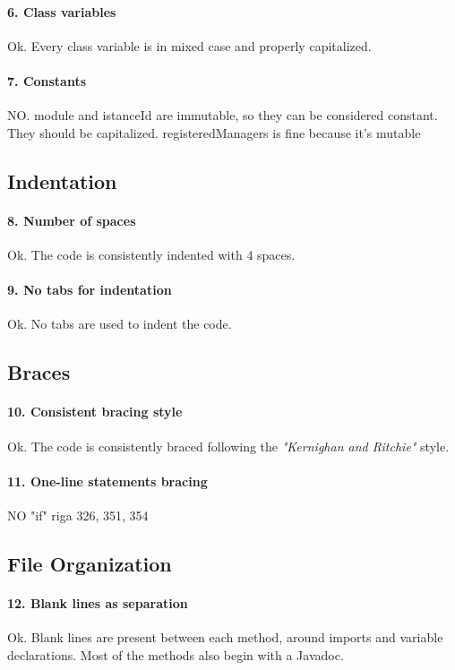 \documentclass[english]{article}
\begin{document}
\paragraph{6. Class variables}
Ok.
Every class variable is in mixed case and properly capitalized.

\paragraph{7. Constants}
NO.
module and istanceId are immutable, so they can be considered constant. They should be capitalized.
registeredManagers is fine because it's mutable

\subsection{Indentation}
\paragraph{8. Number of spaces}
Ok.
The code is consistently indented with 4 spaces.

\paragraph{9. No tabs for indentation}
Ok.
No tabs are used to indent the code.

\subsection{Braces}
\paragraph{10. Consistent bracing style}
Ok.
The code is consistently braced following the \textit{"Kernighan and Ritchie"} style.

\paragraph{11. One-line statements bracing}
NO
"if" riga 326, 351, 354

\subsection{File Organization}
\paragraph{12. Blank lines as separation}
Ok.
Blank lines are present between each method, around imports and variable declarations.
Most of the methods also begin with a Javadoc.
\end{document}
